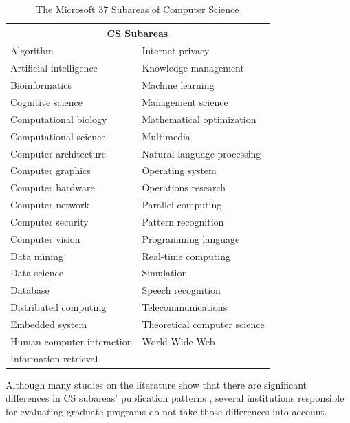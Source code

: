 \documentclass[msc]{ppgccufmg}
\begin{document}
\begin{table}[htbp]
  \label{tab:subareas-list}
  \centering
  \caption{The Microsoft 37 Subareas of Computer Science}
  \begin{tabular}{ll}
    \toprule
    \multicolumn{2}{c}{CS Subareas}\\
    \midrule
    Algorithm & Internet privacy \\
    Artificial intelligence & Knowledge management \\
    Bioinformatics & Machine learning \\ 
    Cognitive science & Management science \\ 
    Computational biology & Mathematical optimization \\ 
    Computational science & Multimedia \\ 
    Computer architecture & Natural language processing \\ 
    Computer graphics & Operating system \\ 
    Computer hardware & Operations research \\ 
    Computer network & Parallel computing \\ 
    Computer security & Pattern recognition \\ 
    Computer vision & Programming language \\ 
    Data mining &  Real-time computing \\ 
    Data science & Simulation \\ 
    Database & Speech recognition \\ 
    Distributed computing & Telecommunications \\ 
    Embedded system & Theoretical computer science \\ 
    Human-computer interaction & World Wide Web \\
    Information retrieval \\
  \bottomrule
\end{tabular}
\end{table}

Although many studies on the literature show that there are significant differences in CS subareas' publication patterns \citep{hoonlor13,lima15,wainer13}, several institutions responsible for evaluating graduate programs do not take those differences into account. 
\end{document}
